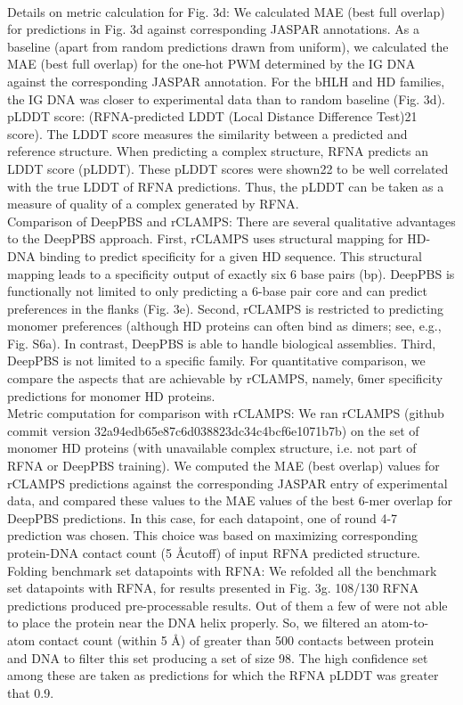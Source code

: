 \\
Details on metric calculation for Fig. 3d: We calculated MAE (best full overlap) for predictions in Fig. 3d against corresponding JASPAR annotations. As a baseline (apart from random predictions drawn from uniform), we calculated the MAE (best full overlap) for the one-hot PWM determined by the IG DNA against the corresponding JASPAR annotation. For the bHLH and HD families, the IG DNA was closer to experimental data than to random baseline (Fig. 3d).
\\
pLDDT score: (RFNA-predicted LDDT (Local Distance Difference Test)21 score). The LDDT score measures the similarity between a predicted and reference structure. When predicting a complex structure, RFNA predicts an LDDT score (pLDDT). These pLDDT scores were shown22 to be well correlated with the true LDDT of RFNA predictions. Thus, the pLDDT can be taken as a measure of quality of a complex generated by RFNA.
\\
Comparison of DeepPBS and rCLAMPS: There are several qualitative advantages to the DeepPBS approach. First, rCLAMPS uses structural mapping for HD-DNA binding to predict specificity for a given HD sequence. This structural mapping leads to a specificity output of exactly six 6 base pairs (bp). DeepPBS is functionally not limited to only predicting a 6-base pair core and can predict preferences in the flanks (Fig. 3e). Second, rCLAMPS is restricted to predicting monomer preferences (although HD proteins can often bind as dimers; see, e.g., Fig. S6a). In contrast, DeepPBS is able to handle biological assemblies. Third, DeepPBS is not limited to a specific family. For quantitative comparison, we compare the aspects that are achievable by rCLAMPS, namely, 6mer specificity predictions for monomer HD proteins.
\\
Metric computation for comparison with rCLAMPS: We ran rCLAMPS (github commit version 32a94edb65e87c6d038823dc34c4bcf6e1071b7b) on the set of monomer HD proteins (with unavailable complex structure, i.e. not part of RFNA or DeepPBS training). We computed the MAE (best overlap) values for rCLAMPS predictions against the corresponding JASPAR entry of experimental data, and compared these values to the MAE values of the best 6-mer overlap for DeepPBS predictions. In this case, for each datapoint, one of round 4-7 prediction was chosen. This choice was based on maximizing corresponding protein-DNA contact count (5 \AA cutoff) of input RFNA predicted structure. 
\\
Folding benchmark set datapoints with RFNA: We refolded all the benchmark set datapoints with RFNA, for results presented in Fig. 3g. 108/130 RFNA predictions produced pre-processable results. Out of them a few of were not able to place the protein near the DNA helix properly. So, we filtered an atom-to-atom contact count (within 5 Å) of greater than 500 contacts between protein and DNA to filter this set producing a set of size 98. The high confidence set among these are taken as predictions for which the RFNA pLDDT was greater that 0.9.
